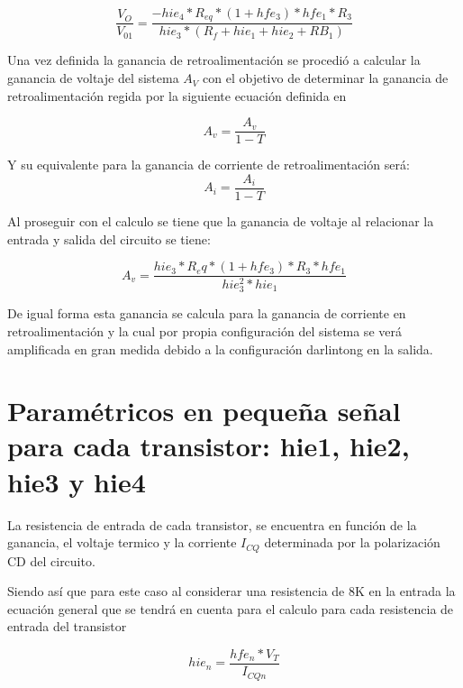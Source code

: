\documentclass[conference]{IEEEtran}
\begin{document}
    \begin{equation}
        \frac{V_O}{V_{01}} = \frac{-hie_4*R_{eq}*(1 + hfe_3)*hfe_1*R_3}{hie_3*(R_f+hie_1+hie_2 + RB_1)}
		\label{eq:t-resultado}
	\end{equation}

    Una vez definida la ganancia de retroalimentación se procedió a calcular la ganancia de voltaje del sistema $A_V$ con el objetivo de determinar la ganancia de retroalimentación regida por la siguiente ecuación definida en \cite{horenstein2000circuitos}

    \begin{equation}
        A_v = \frac{A_v}{1 - T}
		\label{eq:ganancia-av-fb}
	\end{equation}

    Y su equivalente para la ganancia de corriente de retroalimentación será:
    \begin{equation}
        A_i = \frac{A_i}{1 - T}
		\label{eq:ganancia-ai-fb}
	\end{equation}

    Al proseguir con el calculo se tiene que la ganancia de voltaje al relacionar la entrada y salida del circuito se tiene:

    \begin{equation}
        A_v = \frac{hie_3*R_eq*(1+hfe_3)*R_3*hfe_1}{hie_3^2*hie_1}
		\label{eq:ganancia-voltaje}
	\end{equation}

    De igual forma esta ganancia se calcula para la ganancia de corriente en retroalimentación y la cual por propia configuración del sistema se verá amplificada en gran medida debido a la configuración darlintong en la salida.

    
    \section{Paramétricos en pequeña señal para cada transistor: hie1, hie2, hie3 y hie4}

    La resistencia de entrada de cada transistor, se encuentra en función de la ganancia, el voltaje termico y la corriente $I_{CQ}$ determinada por la polarización CD del circuito.

    Siendo así que para este caso al considerar una resistencia de 8K en la entrada la ecuación general que se tendrá en cuenta para el calculo para cada resistencia de entrada del transistor 

    \begin{equation}
        hie_n = \frac{hfe_n*V_T}{I_{CQn}}
		\label{eq:resitencia-entrada-bjt}
	\end{equation}
\end{document}
